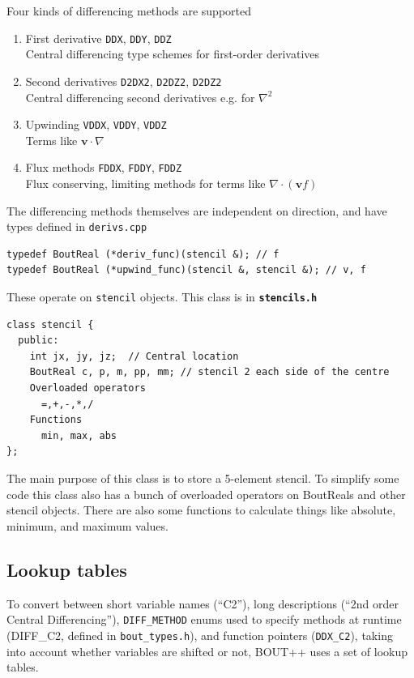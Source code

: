 \documentclass[12pt]{article}
\newcommand{\code}[1]{\texttt{#1}}
\newcommand{\file}[1]{\texttt{\bf #1}}
\begin{document}
Four kinds of differencing methods are supported
\begin{enumerate}
\item First derivative \code{DDX}, \code{DDY}, \code{DDZ} \\
  Central differencing type schemes for first-order derivatives
\item Second derivatives \code{D2DX2}, \code{D2DZ2}, \code{D2DZ2} \\
  Central differencing second derivatives e.g. for $\nabla^2$
\item Upwinding \code{VDDX}, \code{VDDY}, \code{VDDZ} \\
   Terms like $\mathbf{v}\cdot\nabla$
\item Flux methods \code{FDDX}, \code{FDDY}, \code{FDDZ} \\
  Flux conserving, limiting methods for terms like $\nabla\cdot\left(\mathbf{v}f\right)$
\end{enumerate}

The differencing methods themselves are independent on direction, and have
types defined in \texttt{derivs.cpp}
\begin{lstlisting}
typedef BoutReal (*deriv_func)(stencil &); // f
typedef BoutReal (*upwind_func)(stencil &, stencil &); // v, f
\end{lstlisting}
These operate on \code{stencil} objects. This class is in \file{stencils.h}
\begin{lstlisting}
class stencil {
  public:
    int jx, jy, jz;  // Central location
    BoutReal c, p, m, pp, mm; // stencil 2 each side of the centre
    Overloaded operators
      =,+,-,*,/
    Functions
      min, max, abs
};
\end{lstlisting}
The main purpose of this class is to store a 5-element stencil. To simplify some code
this class also has a bunch of overloaded operators on BoutReals and other stencil objects. 
There are also some functions to calculate things like absolute, minimum, and maximum
values.

\subsection{Lookup tables}

To convert between short variable names (``C2''), long descriptions 
(``2nd order Central Differencing''), \texttt{DIFF\_METHOD} enums used to specify methods
at runtime (DIFF\_C2, defined in \texttt{bout\_types.h}), and function pointers
(\texttt{DDX\_C2}), taking into account whether
variables are shifted or not, BOUT++ uses a set of lookup tables.
\end{document}
